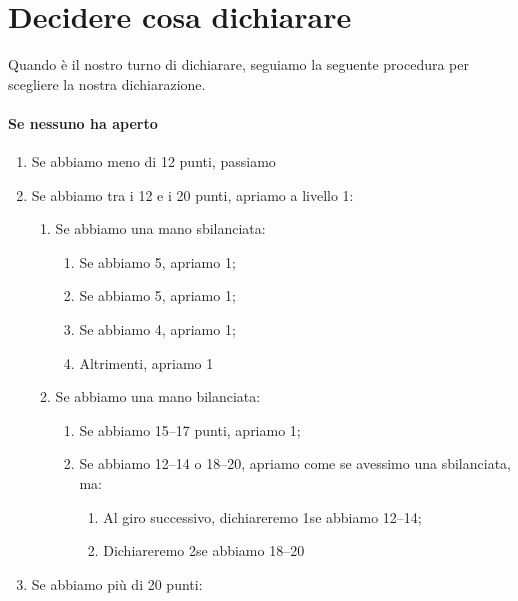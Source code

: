 \documentclass[../corsofiori.tex]{subfiles}
\begin{document}
\section{Decidere cosa dichiarare}

Quando è il nostro turno di dichiarare, seguiamo la seguente procedura per scegliere la nostra dichiarazione.

\paragraph*{Se nessuno ha aperto}

\begin{enumerate}
    \item Se abbiamo meno di 12 punti, passiamo
    \item Se abbiamo tra i 12 e i 20 punti, apriamo a livello 1:
        \begin{enumerate}
            \item Se abbiamo una mano sbilanciata:
                \begin{enumerate}
                    \item Se abbiamo 5\Sp, apriamo 1\Sp;
                    \item Se abbiamo 5\He, apriamo 1\He;
                    \item Se abbiamo 4\Di, apriamo 1\Di;
                    \item Altrimenti, apriamo 1\Cl
                \end{enumerate}
            \item Se abbiamo una mano bilanciata:
                \begin{enumerate}
                \item Se abbiamo 15--17 punti, apriamo 1\SA;
                \item Se abbiamo 12--14 o 18--20, apriamo come se avessimo una sbilanciata, ma:
                    \begin{enumerate}
                   \item Al giro successivo, dichiareremo 1\SA se abbiamo 12--14;
                \item Dichiareremo 2\SA se abbiamo 18--20
                    \end{enumerate}
                \end{enumerate}
        \end{enumerate}
        \item Se abbiamo più di 20 punti:
            \begin{enumerate}

\end{enumerate}
\end{enumerate}
\end{document}
